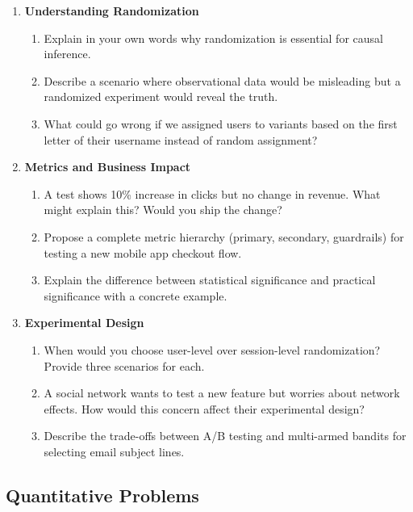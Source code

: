\begin{enumerate}
    \item \textbf{Understanding Randomization}
    \begin{enumerate}
        \item Explain in your own words why randomization is essential for causal inference.
        \item Describe a scenario where observational data would be misleading but a randomized experiment would reveal the truth.
        \item What could go wrong if we assigned users to variants based on the first letter of their username instead of random assignment?
    \end{enumerate}

    \item \textbf{Metrics and Business Impact}
    \begin{enumerate}
        \item A test shows 10\% increase in clicks but no change in revenue. What might explain this? Would you ship the change?
        \item Propose a complete metric hierarchy (primary, secondary, guardrails) for testing a new mobile app checkout flow.
        \item Explain the difference between statistical significance and practical significance with a concrete example.
    \end{enumerate}

    \item \textbf{Experimental Design}
    \begin{enumerate}
        \item When would you choose user-level over session-level randomization? Provide three scenarios for each.
        \item A social network wants to test a new feature but worries about network effects. How would this concern affect their experimental design?
        \item Describe the trade-offs between A/B testing and multi-armed bandits for selecting email subject lines.
    \end{enumerate}
\end{enumerate}

\subsection{Quantitative Problems}

